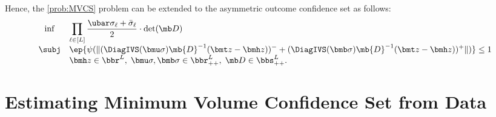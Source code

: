 \documentclass[mnsc, nonblindrev]{informswp}
\newcommand{\1}[1]{\mathds{1}{\left(#1\right)}}
\begin{document}
Hence, the \ref{prob:MVCS} problem can be extended to the asymmetric outcome confidence set as follows:
\[
\begin{array}{cll}
\inf & \displaystyle \prod_{\ell \in [L]} \frac{\ubar \sigma_{\ell} + \bar \sigma_{\ell}}{2} \cdot \det(\mb D) \\
\subj & \displaystyle\ep{\psi(\|(\DiagIVS(\bmu \sigma) \mb{D}^{-1} (\bmt z - \bmh z))^- + (\DiagIVS(\bmb \sigma) \mb{D}^{-1} (\bmt z - \bmh z))^+ \|)} \leq 1 \\
& \bmh z \in \bbr^L, \; \bmu \sigma,\bmb \sigma \in \bbr^L_{++}, \; \mb D \in \bbs^L_{++}.  
\end{array} 
\]

\section{Estimating Minimum Volume Confidence Set from Data}
\label{sec:MVCSEfromData}
\end{document}
